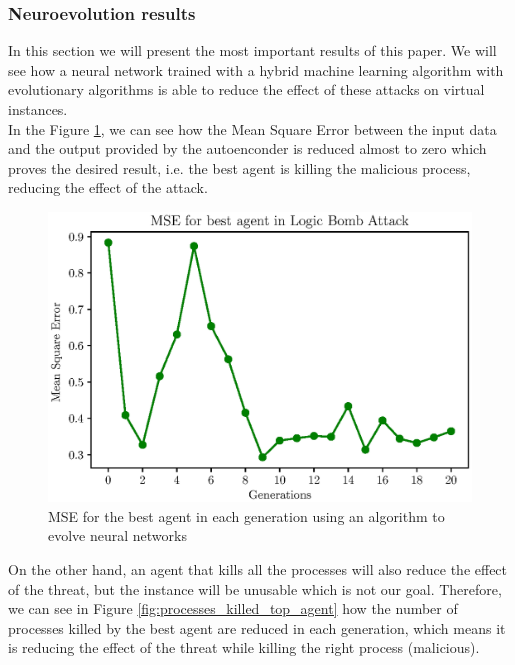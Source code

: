\documentclass{iosart2c}
\begin{document}
\subsubsection{Neuroevolution results}

In this section we will present the most important results of this paper. We will see how a neural network trained with a hybrid machine learning algorithm with evolutionary algorithms is able to reduce the effect of these attacks on virtual instances. \\

In the Figure \ref{fig:reward_top_agent}, we can see how the Mean Square Error between the input data and the output provided by the autoenconder is reduced almost to zero which proves the desired result, i.e. the best agent is killing the malicious process, reducing the effect of the attack. \\






\begin{figure}[h!]
\includegraphics[scale=0.5]{figs/results/reward_best_agent_final.eps}
\vspace{-0.5cm}
\caption{MSE for the best agent in each generation using an algorithm to evolve neural networks}
\label{fig:reward_top_agent}
\end{figure}


On the other hand, an agent that kills all the processes will also reduce the effect of the threat, but the instance will be unusable which is not our goal. Therefore, we can see in Figure \ref{fig:processes_killed_top_agent} how the number of processes killed by the best agent are reduced in each generation, which means it is reducing the effect of the threat while killing the right process (malicious).\\
\end{document}
